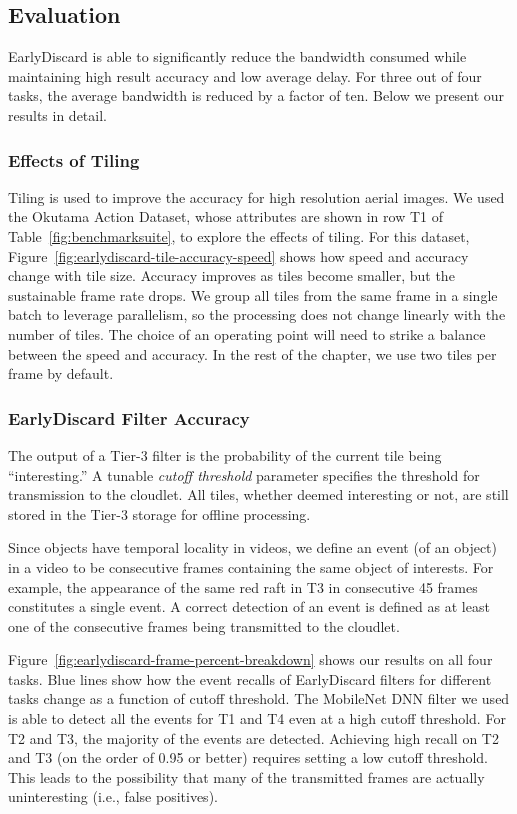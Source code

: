 \subsection{Evaluation}
\label{sec:earlydiscard-result}

EarlyDiscard is able to significantly reduce the bandwidth consumed while
maintaining high result accuracy and low average delay. For three out of four
tasks, the average bandwidth is reduced by a factor of ten. Below we present
our results in detail.

\subsubsection{Effects of Tiling}
Tiling is used to improve the accuracy
for high resolution aerial images. We used the Okutama Action Dataset, whose
attributes are shown in row T1 of Table~\ref{fig:benchmarksuite}, to explore
the effects of tiling.  For this dataset,
Figure~\ref{fig:earlydiscard-tile-accuracy-speed} shows how speed and accuracy
change with tile size.  Accuracy improves as tiles become smaller, but the
sustainable frame rate drops.  We group all tiles from the same frame in a
single batch to leverage parallelism, so the processing does not change linearly
with the number of tiles. The choice of an operating point will need to strike a
balance between the speed and accuracy.  In the rest of the chapter, we use two
tiles per frame by default.

\subsubsection{EarlyDiscard Filter Accuracy}

The output of a Tier-3 filter is the probability of the current tile being
``interesting.''  A tunable {\em cutoff threshold} parameter specifies the
threshold for transmission to the cloudlet. All tiles, whether deemed
interesting or not, are still stored in the Tier-3 storage for offline processing.

Since objects have temporal locality in videos, we define an event (of an
object) in a video to be consecutive frames containing the same object of
interests. For example, the appearance of the same red raft in T3 in consecutive
45 frames constitutes a single event. A correct detection of an event is defined
as at least one of the consecutive frames being transmitted to the cloudlet.

Figure~\ref{fig:earlydiscard-frame-percent-breakdown} shows our results on all
four tasks. Blue lines show how the event recalls of EarlyDiscard filters for different
tasks change as a function of cutoff threshold. The MobileNet DNN filter we used
is able to detect all the events for T1 and T4 even at a high cutoff threshold.
For T2 and T3, the majority of the events are detected. Achieving high recall on
T2 and T3 (on the order of 0.95 or better) requires setting a low cutoff
threshold.  This leads to the possibility that many of the transmitted frames
are actually uninteresting (i.e., false positives).

